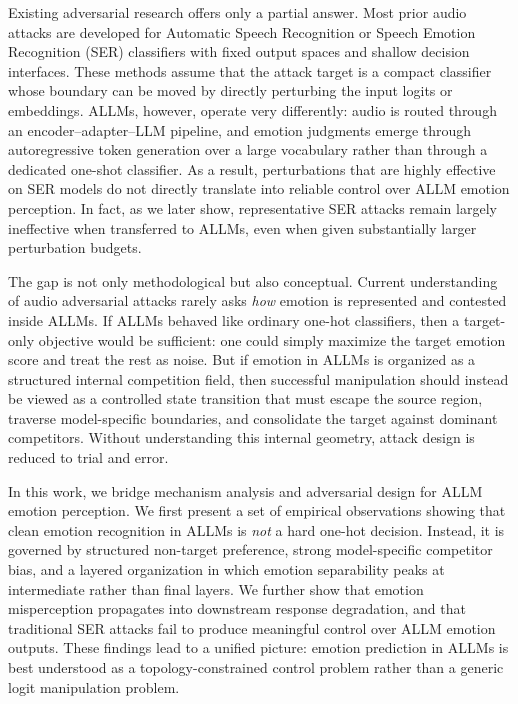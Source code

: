 Existing adversarial research offers only a partial answer.
Most prior audio attacks are developed for Automatic Speech Recognition or Speech Emotion Recognition (SER) classifiers with fixed output spaces and shallow decision interfaces.
These methods assume that the attack target is a compact classifier whose boundary can be moved by directly perturbing the input logits or embeddings.
ALLMs, however, operate very differently: audio is routed through an encoder--adapter--LLM pipeline, and emotion judgments emerge through autoregressive token generation over a large vocabulary rather than through a dedicated one-shot classifier.
As a result, perturbations that are highly effective on SER models do not directly translate into reliable control over ALLM emotion perception.
In fact, as we later show, representative SER attacks remain largely ineffective when transferred to ALLMs, even when given substantially larger perturbation budgets.

The gap is not only methodological but also conceptual.
Current understanding of audio adversarial attacks rarely asks \emph{how} emotion is represented and contested inside ALLMs.
If ALLMs behaved like ordinary one-hot classifiers, then a target-only objective would be sufficient: one could simply maximize the target emotion score and treat the rest as noise.
But if emotion in ALLMs is organized as a structured internal competition field, then successful manipulation should instead be viewed as a controlled state transition that must escape the source region, traverse model-specific boundaries, and consolidate the target against dominant competitors.
Without understanding this internal geometry, attack design is reduced to trial and error.

In this work, we bridge mechanism analysis and adversarial design for ALLM emotion perception.
We first present a set of empirical observations showing that clean emotion recognition in ALLMs is \emph{not} a hard one-hot decision.
Instead, it is governed by structured non-target preference, strong model-specific competitor bias, and a layered organization in which emotion separability peaks at intermediate rather than final layers.
We further show that emotion misperception propagates into downstream response degradation, and that traditional SER attacks fail to produce meaningful control over ALLM emotion outputs.
These findings lead to a unified picture: emotion prediction in ALLMs is best understood as a topology-constrained control problem rather than a generic logit manipulation problem.

